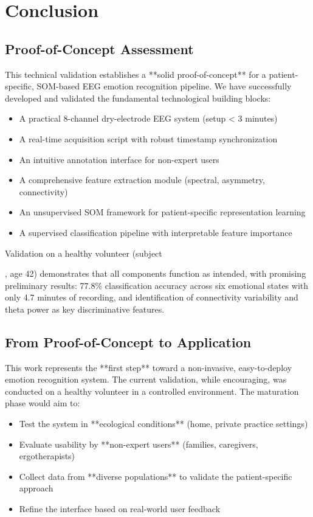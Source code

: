 \section{Conclusion}

\subsection{Proof-of-Concept Assessment}

This technical validation establishes a **solid proof-of-concept** for a patient-specific, SOM-based EEG emotion recognition pipeline. We have successfully developed and validated the fundamental technological building blocks:

\begin{itemize}
    \item A practical 8-channel dry-electrode EEG system (setup < 3 minutes)
    \item A real-time acquisition script with robust timestamp synchronization
    \item An intuitive annotation interface for non-expert users
    \item A comprehensive feature extraction module (spectral, asymmetry, connectivity)
    \item An unsupervised SOM framework for patient-specific representation learning
    \item A supervised classification pipeline with interpretable feature importance
\end{itemize}

Validation on a healthy volunteer (subject \subject{F42}, age 42) demonstrates that all components function as intended, with promising preliminary results: 77.8\% classification accuracy across six emotional states with only 4.7 minutes of recording, and identification of connectivity variability and theta power as key discriminative features.

\subsection{From Proof-of-Concept to Application}

This work represents the **first step** toward a non-invasive, easy-to-deploy emotion recognition system. The current validation, while encouraging, was conducted on a healthy volunteer in a controlled environment. The maturation phase would aim to:

\begin{itemize}
    \item Test the system in **ecological conditions** (home, private practice settings)
    \item Evaluate usability by **non-expert users** (families, caregivers, ergotherapists)
    \item Collect data from **diverse populations** to validate the patient-specific approach
    \item Refine the interface based on real-world user feedback
\end{itemize}

